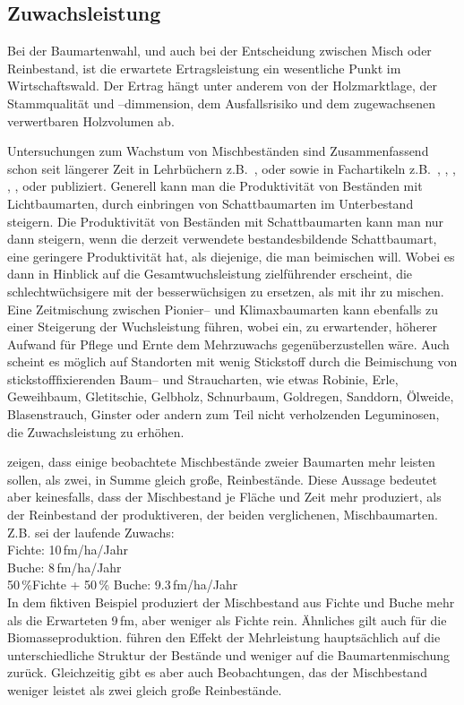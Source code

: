 \documentclass[twocolumn]{scrartcl}
\begin{document}
\subsection{Zuwachsleistung}
\label{ssec:zuwachs}

Bei der Baumartenwahl, und auch bei der Entscheidung zwischen Misch
oder Reinbestand, ist die erwartete Ertragsleistung ein wesentliche
Punkt im Wirtschaftswald. Der Ertrag hängt unter anderem von der
Holzmarktlage, der Stammqualität und --dimmension, dem Ausfallsrisiko
und dem zugewachsenen verwertbaren Holzvolumen ab.

Untersuchungen zum Wachstum von Mischbeständen sind Zusammenfassend
schon seit längerer Zeit in Lehrbüchern z.B.\
\cite{wiedemann1951Ertragskunde}, \cite{assmann1961Waldertraskunde}
oder \cite{mitscherlich1978WaldWachstumUmwelt} sowie in Fachartikeln
z.B.\ \cite{baader1942WasLeistetDerMischbestand},
\cite{kennel1965MischbestandFichteBuche},
\cite{mitscherlich196566ReinUndMischbestand},
\cite{guericke2001mischungBuLae}, \cite{pretzsch2003mischwald},
\cite{bauhus2004mischung} oder \cite{kelty2006mischwald}
publiziert. Generell kann man die Produktivität von Beständen mit
Lichtbaumarten, durch einbringen von Schattbaumarten im Unterbestand
steigern. Die Produktivität von Beständen mit Schattbaumarten kann man
nur dann steigern, wenn die derzeit verwendete bestandesbildende
Schattbaumart, eine geringere Produktivität hat, als diejenige, die
man beimischen will. Wobei es dann in Hinblick auf die
Gesamtwuchsleistung zielführender erscheint, die schlechtwüchsigere
mit der besserwüchsigen zu ersetzen, als mit ihr zu mischen. Eine
Zeitmischung zwischen Pionier-- und Klimaxbaumarten kann ebenfalls zu
einer Steigerung der Wuchsleistung führen, wobei ein, zu erwartender,
höherer Aufwand für Pflege und Ernte dem Mehrzuwachs
gegenüberzustellen wäre. Auch scheint es möglich auf Standorten mit
wenig Stickstoff durch die Beimischung von stickstofffixierenden
Baum-- und Straucharten, wie etwas Robinie, Erle, Geweihbaum,
Gletitschie, Gelbholz, Schnurbaum, Goldregen, Sanddorn, Ölweide,
Blasenstrauch, Ginster oder andern zum Teil nicht verholzenden
Leguminosen, die Zuwachsleistung zu erhöhen.

\cite{pretzsch2017mischwald} zeigen, dass einige beobachtete
Mischbestände zweier Baumarten mehr leisten sollen, als zwei, in Summe
gleich große, Reinbestände. Diese Aussage bedeutet aber keinesfalls,
dass der Mischbestand je Fläche und Zeit mehr produziert, als der
Reinbestand der produktiveren, der beiden verglichenen,
Mischbaumarten. Z.B. sei der laufende Zuwachs:\\
Fichte: 10\,fm/ha/Jahr\\
Buche: 8\,fm/ha/Jahr\\
50\,\%Fichte + 50\,\% Buche: 9.3\,fm/ha/Jahr\\
In dem fiktiven Beispiel produziert der Mischbestand aus Fichte und
Buche mehr als die Erwarteten 9\,fm, aber weniger als Fichte
rein. Ähnliches gilt auch für die Biomasseproduktion.
\cite{sterba2018struktur} führen den Effekt der Mehrleistung
hauptsächlich auf die unterschiedliche Struktur der Bestände und
weniger auf die Baumartenmischung zurück. Gleichzeitig gibt es aber
auch Beobachtungen, das der Mischbestand weniger leistet als zwei
gleich große Reinbestände.
 
\end{document}
